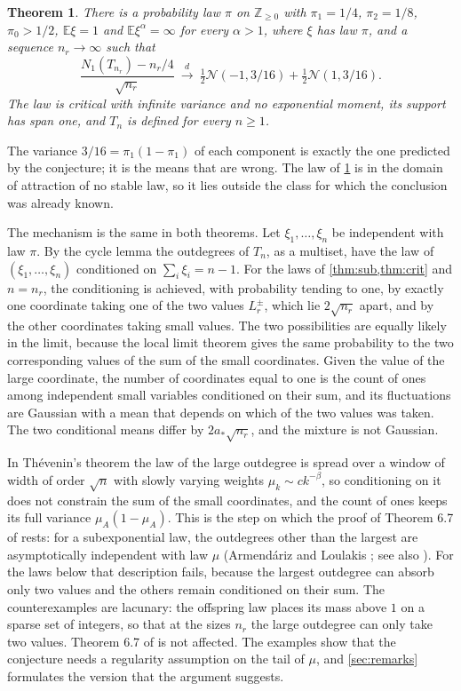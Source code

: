 \documentclass[11pt]{amsart}
\newtheorem{theorem}{Theorem}[section]
\theoremstyle{definition}
\newcommand{\Z}{\mathbb{Z}}
\newcommand{\E}{\mathbb{E}}
\newcommand{\Nor}{\mathcal{N}}
\begin{document}
\begin{theorem}\label{thm:crit}
There is a probability law $\pi$ on $\Z_{\ge0}$ with $\pi_1=1/4$, $\pi_2=1/8$, $\pi_0>1/2$, $\E\xi=1$ and $\E\xi^\alpha=\infty$ for every $\alpha>1$, where $\xi$ has law $\pi$, and a sequence $n_r\to\infty$ such that
\begin{equation}\label{eq:critlimit}
\frac{N_1(T_{n_r})-n_r/4}{\sqrt{n_r}}\ \xrightarrow{d}\ \tfrac12\Nor(-1,3/16)+\tfrac12\Nor(1,3/16).
\end{equation}
The law is critical with infinite variance and no exponential moment, its support has span one, and $T_n$ is defined for every $n\ge1$.
\end{theorem}

The variance $3/16=\pi_1(1-\pi_1)$ of each component is exactly the one predicted by the conjecture; it is the means that are wrong. The law of \cref{thm:crit} is in the domain of attraction of no stable law, so it lies outside the class for which the conclusion was already known.

The mechanism is the same in both theorems. Let $\xi_1,\dots,\xi_n$ be independent with law $\pi$. By the cycle lemma the outdegrees of $T_n$, as a multiset, have the law of $(\xi_1,\dots,\xi_n)$ conditioned on $\sum_i\xi_i=n-1$. For the laws of \cref{thm:sub,thm:crit} and $n=n_r$, the conditioning is achieved, with probability tending to one, by exactly one coordinate taking one of the two values $L_r^\pm$, which lie $2\sqrt{n_r}$ apart, and by the other coordinates taking small values. The two possibilities are equally likely in the limit, because the local limit theorem gives the same probability to the two corresponding values of the sum of the small coordinates. Given the value of the large coordinate, the number of coordinates equal to one is the count of ones among independent small variables conditioned on their sum, and its fluctuations are Gaussian with a mean that depends on which of the two values was taken. The two conditional means differ by $2a_*\sqrt{n_r}$, and the mixture is not Gaussian.

In Th\'evenin's theorem the law of the large outdegree is spread over a window of width of order $\sqrt n$ with slowly varying weights $\mu_k\sim ck^{-\beta}$, so conditioning on it does not constrain the sum of the small coordinates, and the count of ones keeps its full variance $\mu_A(1-\mu_A)$. This is the step on which the proof of Theorem 6.7 of \cite{Thevenin} rests: for a subexponential law, the outdegrees other than the largest are asymptotically independent with law $\mu$ (Armend\'ariz and Loulakis \cite{AL}; see also \cite[Section 19]{Janson12}). For the laws below that description fails, because the largest outdegree can absorb only two values and the others remain conditioned on their sum. The counterexamples are lacunary: the offspring law places its mass above $1$ on a sparse set of integers, so that at the sizes $n_r$ the large outdegree can only take two values. Theorem 6.7 of \cite{Thevenin} is not affected. The examples show that the conjecture needs a regularity assumption on the tail of $\mu$, and \cref{sec:remarks} formulates the version that the argument suggests.
\end{document}
